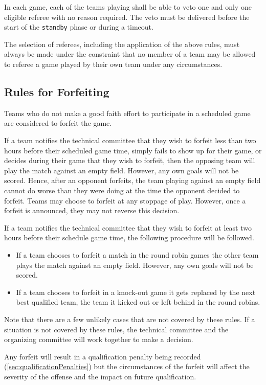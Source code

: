 In each game, each of the teams playing shall be able to veto one and only one eligible referee with no reason required.
The veto must be delivered before the start of the \texttt{standby} phase or during a timeout.

The selection of referees, including the application of the above rules,
must always be made under the constraint that no member of a team may be allowed to
referee a game played by their own team under any circumstances.

\subsection{Rules for Forfeiting}
\label{sec:forfeit}

Teams who do not make a good faith effort to participate in a scheduled game are considered to forfeit the game.

If a team notifies the technical committee that they wish to forfeit less than two hours before their scheduled game time, simply fails to show up for their game, or decides during their game that they wish to forfeit, then the opposing team will play the match against an empty field.
However, any own goals will not be scored.
Hence, after an opponent forfeits, the team playing against an empty field cannot do worse than they were doing at the time the opponent decided to forfeit.
Teams may choose to forfeit at any stoppage of play.
However, once a forfeit is announced, they may not reverse this decision.

If a team notifies the technical committee that they wish to forfeit at least two hours before their schedule game time, the following procedure will be followed.
\begin{itemize}
  \item If a team chooses to forfeit a match in the round robin games the other team plays the match against an empty field.
    However, any own goals will not be scored.
  \item If a team chooses to forfeit in a knock-out game it gets replaced by the next best qualified team, \ie the team it kicked out or left behind in the round robins.
\end{itemize}

Note that there are a few unlikely cases that are not covered by these rules.
If a situation is not covered by these rules, the technical committee and the organizing committee will work together to make a decision.

Any forfeit will result in a qualification penalty being recorded (\cf \cref{sec:qualificationPenalties}) but the circumstances of the forfeit will affect the severity of the offense and the impact on future qualification.

